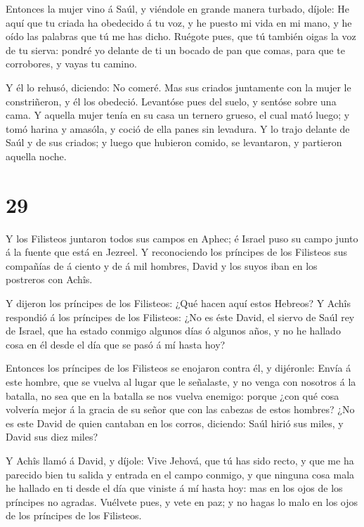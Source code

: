  Entonces la mujer vino á Saúl, y viéndole en grande manera
turbado, díjole: He aquí que tu criada ha obedecido á tu voz, y he
puesto mi vida en mi mano, y he oído las palabras que tú me has dicho.
 Ruégote pues, que tú también oigas la voz de tu sierva:
pondré yo delante de ti un bocado de pan que comas, para que te
corrobores, y vayas tu camino.

 Y él lo rehusó, diciendo: No comeré. Mas sus criados
juntamente con la mujer le constriñeron, y él los obedeció. Levantóse
pues del suelo, y sentóse sobre una cama.  Y aquella mujer
tenía en su casa un ternero grueso, el cual mató luego; y tomó harina y
amasóla, y coció de ella panes sin levadura.  Y lo trajo
delante de Saúl y de sus criados; y luego que hubieron comido, se
levantaron, y partieron aquella noche.

\hypertarget{section-28}{%
\section{29}\label{section-28}}

 Y los Filisteos juntaron todos sus campos en Aphec; é
Israel puso su campo junto á la fuente que está en Jezreel. 
Y reconociendo los príncipes de los Filisteos sus compañías de á ciento
y de á mil hombres, David y los suyos iban en los postreros con Achîs.

 Y dijeron los príncipes de los Filisteos: ¿Qué hacen aquí
estos Hebreos? Y Achîs respondió á los príncipes de los Filisteos: ¿No
es éste David, el siervo de Saúl rey de Israel, que ha estado conmigo
algunos días ó algunos años, y no he hallado cosa en él desde el día que
se pasó á mí hasta hoy?

 Entonces los príncipes de los Filisteos se enojaron contra
él, y dijéronle: Envía á este hombre, que se vuelva al lugar que le
señalaste, y no venga con nosotros á la batalla, no sea que en la
batalla se nos vuelva enemigo: porque ¿con qué cosa volvería mejor á la
gracia de su señor que con las cabezas de estos hombres? 
¿No es este David de quien cantaban en los corros, diciendo: Saúl hirió
sus miles, y David sus diez miles?

 Y Achîs llamó á David, y díjole: Vive Jehová, que tú has
sido recto, y que me ha parecido bien tu salida y entrada en el campo
conmigo, y que ninguna cosa mala he hallado en ti desde el día que
viniste á mí hasta hoy: mas en los ojos de los príncipes no agradas.
 Vuélvete pues, y vete en paz; y no hagas lo malo en los
ojos de los príncipes de los Filisteos.

